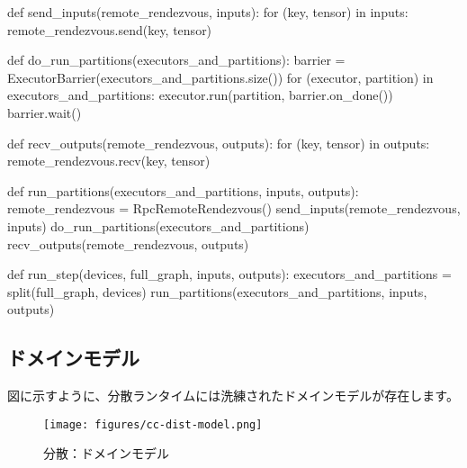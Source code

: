 \begin{content}


\begin{leftbar}
\begin{python}
def send_inputs(remote_rendezvous, inputs):
  for (key, tensor) in inputs:
    remote_rendezvous.send(key, tensor)

def do_run_partitions(executors_and_partitions):
  barrier = ExecutorBarrier(executors_and_partitions.size())
  for (executor, partition) in executors_and_partitions:
    executor.run(partition, barrier.on_done())  
  barrier.wait()

def recv_outputs(remote_rendezvous, outputs):
  for (key, tensor) in outputs:
    remote_rendezvous.recv(key, tensor)

def run_partitions(executors_and_partitions, inputs, outputs):
  remote_rendezvous = RpcRemoteRendezvous()
  send_inputs(remote_rendezvous, inputs)
  do_run_partitions(executors_and_partitions)
  recv_outputs(remote_rendezvous, outputs)

def run_step(devices, full_graph, inputs, outputs):
  executors_and_partitions = split(full_graph, devices)
  run_partitions(executors_and_partitions, inputs, outputs)
\end{python}
\end{leftbar}

\subsection{ドメインモデル}

図に示すように、\tf{}分散ランタイムには洗練されたドメインモデルが存在します。

\begin{figure}[H]
\centering
\texttt{[image: figures/cc-dist-model.png]}
\caption{分散：ドメインモデル}
 \label{fig:cc-dist-model}
\end{figure}


\end{content}
